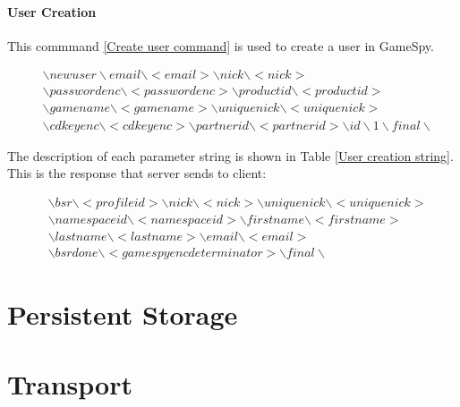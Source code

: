 \documentclass[oneside,titlepage,a4paper]{Definition/retrospy} %
\begin{document}
\subsubsection{User Creation}
This commmand \ref{Create user command} is used to create a user in GameSpy.
\begin{tcolorbox}
	\begin{equation}\label{Create user command}
	\begin{split}
	&\backslash newuser \backslash email \backslash < email > \backslash nick \backslash < nick > \\
	& \backslash passwordenc \backslash < passwordenc > 
	\backslash productid \backslash < productid > \\
	& \backslash gamename \backslash < gamename > \backslash uniquenick \backslash < uniquenick > \\
	& \backslash cdkeyenc \backslash < cdkeyenc > \backslash partnerid \backslash < partnerid > \backslash id \backslash 1 \backslash final \backslash
	\end{split}	
	\end{equation}
\end{tcolorbox}

The description of each parameter string is shown in Table \ref{User creation string}.
This is the response that server sends to client:
\begin{tcolorbox}
\begin{equation}
	\begin{split}
	&\backslash bsr \backslash <profileid> \backslash nick \backslash <nick>	\backslash uniquenick \backslash <uniquenick> \\
	&\backslash namespaceid \backslash <namespaceid>\backslash firstname \backslash <firstname> \\ 
	&\backslash lastname \backslash <lastname>\backslash email \backslash <email> \\
	&\backslash bsrdone \backslash <gamespy enc determinator> \backslash final \backslash
	\end{split}
\end{equation}
\end{tcolorbox}

\chapter{Persistent Storage}
\chapter{Transport}
\end{document}
